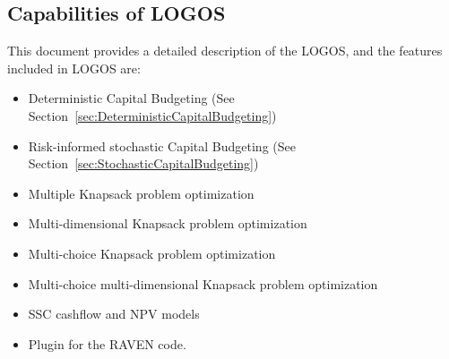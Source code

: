 \subsection{Capabilities of LOGOS}
This document provides a detailed description of the LOGOS, and the features included in LOGOS are:
\begin{itemize}
	\item Deterministic Capital Budgeting (See Section~\ref{sec:DeterministicCapitalBudgeting})
	\item Risk-informed stochastic Capital Budgeting (See Section~\ref{sec:StochasticCapitalBudgeting})
	\item Multiple Knapsack problem optimization
	\item Multi-dimensional Knapsack problem optimization
	\item Multi-choice Knapsack problem optimization
	\item Multi-choice multi-dimensional Knapsack problem optimization
	\item SSC cashflow and NPV models
	\item Plugin for the RAVEN code.
\end{itemize}
